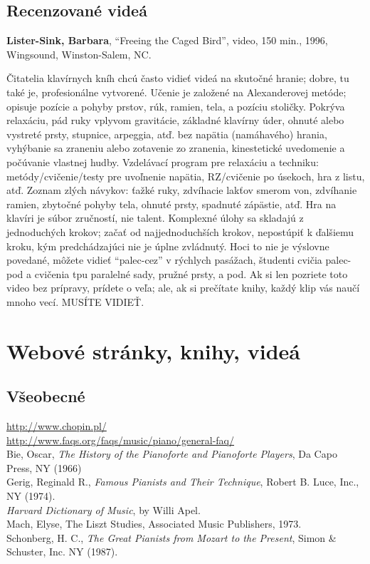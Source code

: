 \subsection*{Recenzované videá}
\textbf{Lister-Sink, Barbara}, “Freeing the Caged Bird”, video, 150 min., 1996, Wingsound, Winston-Salem, NC. 

Čitatelia klavírnych kníh chcú často vidieť videá na skutočné hranie; dobre, tu také je, profesionálne vytvorené. Učenie je založené na Alexanderovej metóde; opisuje pozície a pohyby prstov, rúk, ramien, tela, a pozíciu stoličky. Pokrýva relaxáciu, pád ruky vplyvom gravitácie, základné klavírny úder, ohnuté alebo vystreté prsty, stupnice, arpeggia, atď. bez napätia (namáhavého) hrania, vyhýbanie sa zraneniu alebo zotavenie zo zranenia, kinestetické uvedomenie a počúvanie vlastnej hudby. Vzdelávací program pre relaxáciu a techniku: metódy/cvičenie/testy pre uvoľnenie napätia, RZ/cvičenie po úsekoch, hra z listu, atď. Zoznam zlých návykov: ťažké ruky, zdvíhacie lakťov smerom von, zdvíhanie ramien, zbytočné pohyby tela, ohnuté prsty, spadnuté zápästie, atď. Hra na klavíri je súbor zručností, nie talent. Komplexné úlohy sa skladajú z jednoduchých krokov; začať od najjednoduchších krokov, nepostúpiť k ďalšiemu kroku, kým predchádzajúci nie je úplne zvládnutý. Hoci to nie je výslovne povedané, môžete vidieť “palec-cez” v rýchlych pasážach, študenti cvičia palec-pod a cvičenia tpu paralelné sady, pružné prsty, a pod. Ak si len pozriete toto video bez prípravy, prídete o veľa; ale, ak si prečítate knihy, každý klip vás naučí mnoho vecí. MUSÍTE VIDIEŤ.

\section*{Webové stránky, knihy, videá}

\subsection*{Všeobecné}
\href{http://www.chopin.pl/}{http://www.chopin.pl/}\\
\href{http://www.faqs.org/faqs/music/piano/general-faq/}{http://www.faqs.org/faqs/music/piano/general-faq/}\\
Bie, Oscar, \textit{The History of the Pianoforte and Pianoforte Players}, Da Capo Press, NY (1966)\\
Gerig, Reginald R., \textit{Famous Pianists and Their Technique}, Robert B. Luce, Inc., NY (1974).\\
\textit{Harvard Dictionary of Music}, by Willi Apel.\\
Mach, Elyse, The Liszt Studies, Associated Music Publishers, 1973.\\
Schonberg, H. C., \textit{The Great Pianists from Mozart to the Present}, Simon \& Schuster, Inc. NY (1987).

